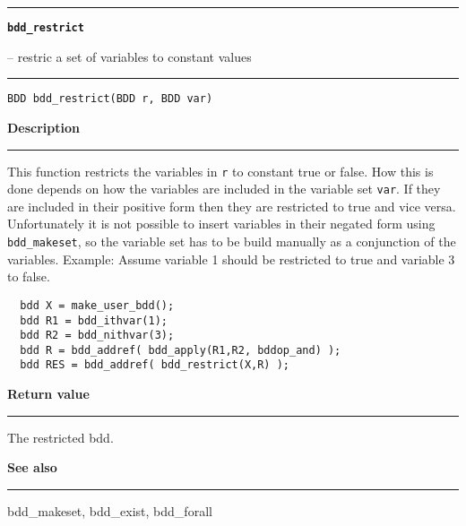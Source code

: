 \vspace{8ex}
\begin{minipage}{\textwidth}

\noindent\begin{minipage}{\textwidth}
\rule{\textwidth}{0.5mm}
{\tt\bf bdd\_restrict }
\--- restric a set of variables to constant values  \hspace{\fill}
\\\rule[1.5ex]{\textwidth}{0.5mm}
\end{minipage}

\noindent\begin{verbatim}
BDD bdd_restrict(BDD r, BDD var) 
\end{verbatim}

\vspace{\parsep}\noindent
{\bf Description}\\\rule[1.5ex]{\textwidth}{0.2mm}\vspace{-1.5ex}\setlength{\parindent}{1em}
This function restricts the variables in {\tt r} to constant
           true or false. How this is done
	   depends on how the variables are included in the variable set
	   {\tt var}. If they
	   are included in their positive form then they are restricted to
	   true and vice versa. Unfortunately it is not possible to
	   insert variables in their negated form using {\tt bdd\_makeset},
	   so the variable set has to be build manually as a
	   conjunction of the variables. Example: Assume variable 1 should be
	   restricted to true and variable 3 to false.
	   \begin{verbatim}
  bdd X = make_user_bdd();
  bdd R1 = bdd_ithvar(1);
  bdd R2 = bdd_nithvar(3);
  bdd R = bdd_addref( bdd_apply(R1,R2, bddop_and) );
  bdd RES = bdd_addref( bdd_restrict(X,R) );
\end{verbatim}
	   

\setlength{\parindent}{0em}\vspace{\parsep}\vspace{\baselineskip}\noindent
{\bf Return value}\\\rule[1.5ex]{\textwidth}{0.2mm}\vspace{-1.5ex}
The restricted bdd. 

\vspace{\parsep}\vspace{\baselineskip}\noindent
{\bf See also}\\\rule[1.5ex]{\textwidth}{0.2mm}\vspace{-1.5ex}
bdd\_makeset, bdd\_exist, bdd\_forall 
\end{minipage}
